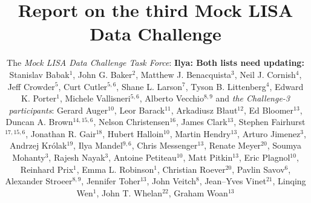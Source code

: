 \documentclass{iopart}
\newcommand{\ilya}[1]{{\color{red} \bf Ilya: #1}}
\begin{document}
\title{Report on the third Mock LISA Data Challenge} 

\author{The \emph{Mock LISA Data Challenge Task Force}:
\ilya{Both lists need updating: }
Stanislav Babak$^1$,
John G. Baker$^2$,
Matthew J. Benacquista$^3$,
Neil J. Cornish$^4$,
Jeff Crowder$^5$,
Curt Cutler$^{5,6}$,
Shane L. Larson$^7$,
Tyson B. Littenberg$^4$,
Edward K. Porter$^1$,
Michele Vallisneri$^{5,6}$,
Alberto Vecchio$^{8,9}$ and \emph{the Challenge-3 participants}:
Gerard Auger$^{10}$,
Leor Barack$^{11}$,
Arkadiusz B\l aut$^{12}$,
Ed Bloomer$^{13}$,
Duncan A. Brown$^{14,15,6}$,
Nelson Christensen$^{16}$,
James Clark$^{13}$,
Stephen Fairhurst$^{17,15,6}$,
Jonathan R. Gair$^{18}$,
Hubert Halloin$^{10}$,
Martin Hendry$^{13}$,
Arturo Jimenez$^3$,
Andrzej Kr\'olak$^{19}$,
Ilya Mandel$^{9,6}$,
Chris Messenger$^{13}$,
Renate Meyer$^{20}$,
Soumya Mohanty$^3$,
Rajesh Nayak$^3$,
Antoine Petiteau$^{10}$,
Matt Pitkin$^{13}$,
Eric Plagnol$^{10}$,
Reinhard Prix$^1$,
Emma L. Robinson$^1$,
Christian Roever$^{20}$,
Pavlin Savov$^{6}$,
Alexander Stroeer$^{8,9}$,
Jennifer Toher$^{13}$,
John Veitch$^8$,
Jean--Yves Vinet$^{21}$,
Linqing Wen$^1$,
John T. Whelan$^{22}$,
Graham Woan$^{13}$}
\address{$^1$ Max-Planck-Institut f\"ur Gravitationsphysik (Albert-Einstein-Institut), Am M\"uhlenberg 1, D-14476 Golm bei Potsdam, Germany}
\address{$^2$ Gravitational Astrophysics Lab., NASA Goddard Space Flight Center, 8800 Greenbelt Rd., Greenbelt, MD 20771, USA}
\address{$^3$ Center for Gravitational Wave Astronomy, Univ.\ of Texas at Brownsville, Brownsville, TX 78520, USA}
\address{$^4$ Dept.\ of Physics, Montana State Univ., Bozeman, MT 59717, USA}
\address{$^5$ Jet Propulsion Laboratory, California Inst.\ of Technology, Pasadena, CA 91109, USA}
\address{$^6$ Theoretical Astrophysics, California Inst.\ of Technology, Pasadena, CA 91125}
\address{$^7$ Dept.\ of Physics, Weber State Univ., 2508 University Circle, Ogden, UT 84408, USA}
\address{$^8$ School of Physics and Astronomy, Univ.\ of Birmingham, Edgbaston, Birmingham B152TT, UK}
\address{$^9$ Dept.\ of Physics and Astronomy, Northwestern Univ., Evanston, IL, USA}
\address{$^{10}$ APC, UMR 7164, Univ.\ Paris 7 Denis Diderot, 10, rue Alice Domon et Leonie Duquet, 75025 Paris Cedex 13, France}
\address{$^{11}$ School of Mathematics, Univ.\ of Southampton, Southampton, SO171BJ, UK}
\address{$^{12}$ Inst.\ of Theoretical Physics, Univ.\ of Wroc\l aw, Wroc\l aw, Poland}
\address{$^{13}$ Dept.\ of Physics and Astronomy, Univ.\ of Glasgow, Glasgow, UK}
\address{$^{14}$ Dept.\ of Physics, Syracuse Univ., Syracuse, NY13244, USA}
\address{$^{15}$ LIGO Laboratory, California Inst.\ of Technology, Pasadena, CA 91125}
\end{document}
